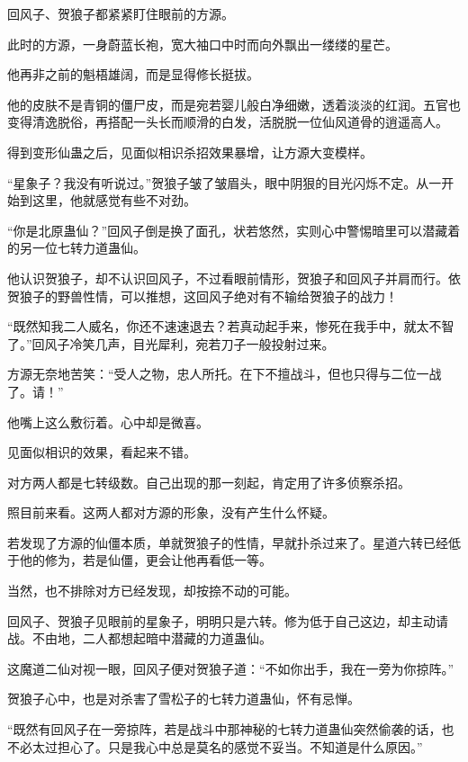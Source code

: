 
\begin{this_body}



回风子、贺狼子都紧紧盯住眼前的方源。

此时的方源，一身蔚蓝长袍，宽大袖口中时而向外飘出一缕缕的星芒。

他再非之前的魁梧雄阔，而是显得修长挺拔。

他的皮肤不是青铜的僵尸皮，而是宛若婴儿般白净细嫩，透着淡淡的红润。五官也变得清逸脱俗，再搭配一头长而顺滑的白发，活脱脱一位仙风道骨的逍遥高人。

得到变形仙蛊之后，见面似相识杀招效果暴增，让方源大变模样。

“星象子？我没有听说过。”贺狼子皱了皱眉头，眼中阴狠的目光闪烁不定。从一开始到这里，他就感觉有些不对劲。

“你是北原蛊仙？”回风子倒是换了面孔，状若悠然，实则心中警惕暗里可以潜藏着的另一位七转力道蛊仙。

他认识贺狼子，却不认识回风子，不过看眼前情形，贺狼子和回风子并肩而行。依贺狼子的野兽性情，可以推想，这回风子绝对有不输给贺狼子的战力！

“既然知我二人威名，你还不速速退去？若真动起手来，惨死在我手中，就太不智了。”回风子冷笑几声，目光犀利，宛若刀子一般投射过来。

方源无奈地苦笑：“受人之物，忠人所托。在下不擅战斗，但也只得与二位一战了。请！”

他嘴上这么敷衍着。心中却是微喜。

见面似相识的效果，看起来不错。

对方两人都是七转级数。自己出现的那一刻起，肯定用了许多侦察杀招。

照目前来看。这两人都对方源的形象，没有产生什么怀疑。

若发现了方源的仙僵本质，单就贺狼子的性情，早就扑杀过来了。星道六转已经低于他的修为，若是仙僵，更会让他再看低一等。

当然，也不排除对方已经发现，却按捺不动的可能。

回风子、贺狼子见眼前的星象子，明明只是六转。修为低于自己这边，却主动请战。不由地，二人都想起暗中潜藏的力道蛊仙。

这魔道二仙对视一眼，回风子便对贺狼子道：“不如你出手，我在一旁为你掠阵。”

贺狼子心中，也是对杀害了雪松子的七转力道蛊仙，怀有忌惮。

“既然有回风子在一旁掠阵，若是战斗中那神秘的七转力道蛊仙突然偷袭的话，也不必太过担心了。只是我心中总是莫名的感觉不妥当。不知道是什么原因。”


\end{this_body}
